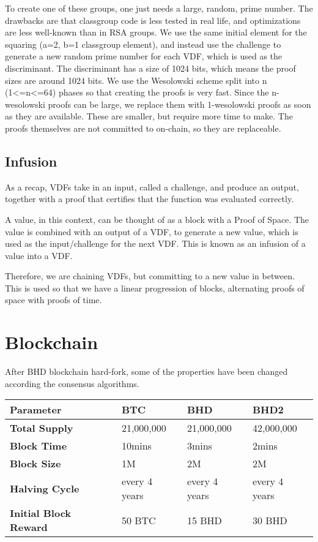 \begin{flushleft}
    To create one of these groups, one just needs a large, random, prime number. The drawbacks are that classgroup code is less tested in real life, and optimizations are less well-known than in RSA groups. We use the same initial element for the squaring (a=2, b=1 classgroup element), and instead use the challenge to generate a new random prime number for each VDF, which is used as the discriminant. The discriminant has a size of 1024 bits, which means the proof sizes are around 1024 bits. We use the Wesolowski scheme split into n (1<=n<=64) phases so that creating the proofs is very fast. Since the n-wesolowski proofs can be large, we replace them with 1-wesolowski proofs as soon as they are available. These are smaller, but require more time to make. The proofs themselves are not committed to on-chain, so they are replaceable.
\end{flushleft}
\subsection{Infusion}
\begin{flushleft}
    As a recap, VDFs take in an input, called a challenge, and produce an output, together with a proof that certifies that the function was evaluated correctly.
\end{flushleft}
\begin{flushleft}
    A value, in this context, can be thought of as a block with a Proof of Space. The value is combined with an output of a VDF, to generate a new value, which is used as the input/challenge for the next VDF. This is known as an infusion of a value into a VDF.
\end{flushleft}
\begin{flushleft}
    Therefore, we are chaining VDFs, but committing to a new value in between. This is used so that we have a linear progression of blocks, alternating proofs of space with proofs of time.
\end{flushleft}
\section{Blockchain}
\begin{flushleft}
    After BHD blockchain hard-fork, some of the properties have been changed according the consensus algorithms.
\end{flushleft}
\begin{tabular}{ p{4cm} p{2.5cm} p{2.5cm} p{2.5cm}  }
    \hline
    \rowcolor{lightgray} \textbf{Parameter} & \textbf{BTC} & \textbf{BHD} & \textbf{BHD2} \\[5pt]
    \hline
    \textbf{Total Supply} & 21,000,000 & 21,000,000 & 42,000,000 \\[5pt]
    \rowcolor{lightgray!30} \textbf{Block Time} & 10mins & 3mins & 2mins \\[5pt]
    \textbf{Block Size} & 1M & 2M & 2M \\[5pt]
    \rowcolor{lightgray!30} \textbf{Halving Cycle} & every 4 years & every 4 years & every 4 years \\[5pt]
    \textbf{Initial Block Reward} & 50 BTC & 15 BHD & 30 BHD \\[5pt]
    \hline
\end{tabular}
